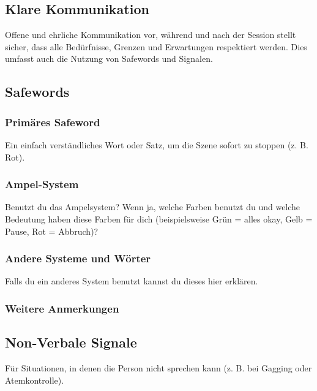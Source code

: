 \documentclass[a4paper,12pt]{article}
\begin{document}
 \subsection{Klare Kommunikation}
Offene und ehrliche Kommunikation vor, während und nach der Session stellt sicher, dass alle Bedürfnisse, Grenzen und Erwartungen respektiert werden. Dies umfasst auch die Nutzung von Safewords und Signalen.
\newpage

\subsection{Safewords}
\subsubsection{Primäres Safeword}
\noindent Ein einfach verständliches Wort oder Satz, um die Szene sofort zu stoppen (z. B. \glqq Rot\grqq). \newline
\noindent \TextField[name=SafewordWord,multiline=true,height=3em, width=37em]{}

\subsubsection{Ampel-System}
\noindent Benutzt du das Ampelsystem? Wenn ja, welche Farben benutzt du und welche Bedeutung haben diese Farben für dich (beispielsweise Grün = alles okay, Gelb = Pause, Rot = Abbruch)? \newline
\noindent \TextField[name=SafewordFarben,multiline=true,height=5em, width=37em]{}

\subsubsection{Andere Systeme und Wörter}
\noindent Falls du ein anderes System benutzt kannst du dieses hier erklären. \newline
\noindent \TextField[name=SafewordAnderesSystem,multiline=true,height=10em, width=37em]{}

\subsubsection{Weitere Anmerkungen}
\noindent \TextField[name=SafewordAnmerkungen,multiline=true,height=10em, width=37em]{}

\newpage
\subsection{Non-Verbale Signale}
Für Situationen, in denen die Person nicht sprechen kann (z. B. bei Gagging oder Atemkontrolle). 
\end{document}
